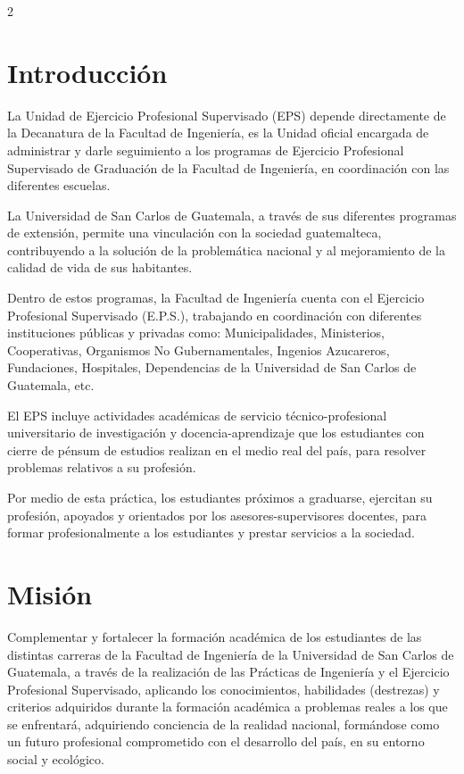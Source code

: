 \documentclass[11pt,spanish,Letterpaper,openany]{book}
\begin{document}
\begin {multicols}{2}

\hypertarget{introduccion}{%
\section*{Introducción}\label{introduccion}}

La Unidad de Ejercicio Profesional Supervisado (EPS) depende directamente de la Decanatura de la Facultad de Ingeniería, es la Unidad oficial encargada de administrar y darle seguimiento a los programas de Ejercicio Profesional Supervisado de Graduación de la Facultad de Ingeniería, en coordinación con las diferentes escuelas.

La Universidad de San Carlos de Guatemala, a través de sus diferentes programas de extensión, permite una vinculación con la sociedad guatemalteca, contribuyendo a la solución de la problemática nacional y al mejoramiento de la calidad de vida de sus habitantes.

Dentro de estos programas, la Facultad de Ingeniería cuenta con el Ejercicio Profesional Supervisado (E.P.S.), trabajando en coordinación con diferentes instituciones públicas y privadas como: Municipalidades, Ministerios, Cooperativas, Organismos No Gubernamentales, Ingenios Azucareros, Fundaciones, Hospitales, Dependencias de la Universidad de San Carlos de Guatemala, etc.

El EPS incluye actividades académicas de servicio técnico-profesional universitario de investigación y docencia-aprendizaje que los estudiantes con cierre de pénsum de estudios realizan en el medio real del país, para resolver problemas relativos a su profesión.

Por medio de esta práctica, los estudiantes próximos a graduarse, ejercitan su profesión, apoyados y orientados por los asesores-supervisores docentes, para formar profesionalmente a los estudiantes y prestar servicios a la sociedad.

\hypertarget{mision}{%
\section*{Misión}\label{mision}}

Complementar y fortalecer la formación académica de los estudiantes de las distintas carreras de la Facultad de Ingeniería de la Universidad de San Carlos de Guatemala, a través de la realización de las Prácticas de Ingeniería y el Ejercicio Profesional Supervisado, aplicando los conocimientos, habilidades (destrezas) y criterios adquiridos durante la formación académica a problemas reales a los que se enfrentará, adquiriendo conciencia de la realidad nacional, formándose como un futuro profesional comprometido con el desarrollo del país, en su entorno social y ecológico.


\end{multicols}
\end{document}

